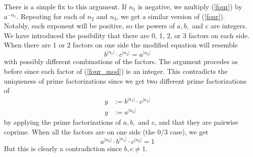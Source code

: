 \documentclass[12pt, reqno]{amsart}
\theoremstyle{definition}
\theoremstyle{remark}
\begin{document}
There is a simple fix to this argument. If $n_1$ is negative, we multiply (\ref{four}) by $a^{-n_1}$. Repeating for each of $n_2$ and $n_3$, we get a similar version of (\ref{four}). Notably, each exponent will be positive, so the powers of $a,b,$ and $c$ are integers. We have introduced the posibility that there are 0, 1, 2, or 3 factors on each side. When there are 1 or 2 factors on one side the modified equation will resemble 
\begin{equation} \label{four_mod}
    b^{|n_1|}\cdot c^{|n_2|}=a^{|n_3|}
\end{equation}
with possibly different combinations of the factors. The argument procedes as before since each factor of (\ref{four_mod}) is an integer. This contradicts the uniqueness of prime factorizations since we get two different prime factorizations of 
\begin{align*}
    y&:=b^{|n_1|}\cdot c^{|n_2|}\\
    y&:=a^{|n_3|}
\end{align*}
by applying the prime factorizations of $a,b,$ and $c$, and that they are pairwise coprime. 
When all the factors are on one side (the 0/3 case), we get
\begin{equation}
    a^{|n_3|}\cdot b^{|n_1|}\cdot c^{|n_2|}=1
\end{equation}
But this is clearly a contradiction since $b,c\ne1$. 
\end{document}
